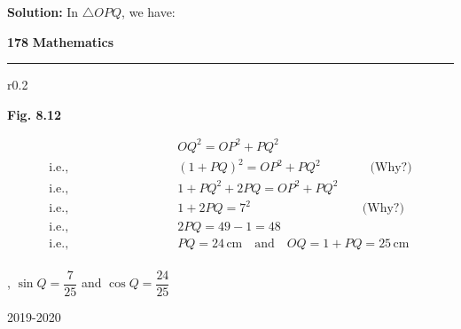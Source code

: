 \documentclass[12pt]{article}
\begin{document}
\vspace{0.5em}
\noindent
\textbf{\textcolor{headerblue}{Solution:}} In $\triangle OPQ$, we have:

\newpage
\noindent
\textcolor{headerblue}{\textbf{178}} \hfill 
\vspace{-9pt}
\textcolor{headerblue}{\textbf{Mathematics}} \\
\textcolor{headerblue}{\rule{\textwidth}{2pt}}

\begin{wrapfigure}{r}{0.2\textwidth}
\vspace{-1em}
\centering
{}

\textcolor{headerblue}{\textbf{Fig. 8.12}}
\end{wrapfigure}

\begin{align*}
    & OQ^2 = OP^2 + PQ^2 \\
    \text{i.e.,} \qquad \qquad \qquad \qquad & (1 + PQ)^2 = OP^2 + PQ^2 \qquad \qquad \text{(Why?)} \\
    \text{i.e.,} \qquad \qquad \qquad \qquad & 1 + PQ^2 + 2PQ = OP^2 + PQ^2 \\
    \text{i.e.,} \qquad \qquad \qquad \qquad & 1 + 2PQ = 7^2 \qquad \qquad \qquad \qquad \quad \text{(Why?)} \\
    \text{i.e.,} \qquad \qquad \qquad \qquad & 2PQ = 49 - 1 = 48 \\
    \text{i.e.,} \qquad \qquad \qquad \qquad & PQ = 24\,\text{cm}\quad\text{and}\quad OQ = 1 + PQ = 25\,\text{cm} \\
\end{align*}

\quad{}, \qquad \qquad \qquad \qquad $\displaystyle \sin Q = \dfrac{7}{25}$ \quad and \quad $\displaystyle \cos Q = \dfrac{24}{25}$
\vspace{0.5em}

\centerline{2019-2020}
\end{document}
